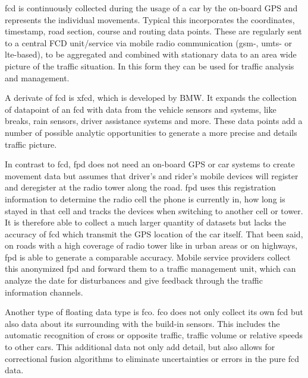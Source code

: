 \documentclass[a4paper,12pt]{report}
\begin{document}
\par \acrfull{fcd} is continuously collected during the usage of a car by the on-board GPS and represents the individual movements. Typical this incorporates the coordinates, timestamp, road section, course and routing data points. These are regularly sent to a central FCD unit/service via mobile radio communication (\acrshort{gsm}-, \acrshort{umts}- or \acrshort{lte}-based), to be aggregated and combined with stationary data to an area wide picture of the traffic situation. In this form they can be used for traffic analysis and management. \cite{Randelhoff2016,LAPID2020}

\par A derivate of \acrshort{fcd} is \acrfull{xfcd}, which is developed by BMW. It expands the collection of datapoint of an \acrshort{fcd} with data from the vehicle sensors and systems, like breaks, rain sensors, driver assistance systems and more. These data points add a number of possible analytic opportunities to generate a more precise and details traffic picture. \cite{LAPID2020}

\par In contrast to \acrshort{fcd}, \acrlong{fpd} does not need an on-board GPS or car systems to create movement data but assumes that driver’s and rider’s mobile devices will register and deregister at the radio tower along the road. \acrshort{fpd} uses this registration information to determine the radio cell the phone is currently in, how long is stayed in that cell and tracks the devices when switching to another cell or tower. It is therefore able to collect a much larger quantity of datasets but lacks the accuracy of \acrshort{fcd} which transmit the GPS location of the car itself. That been said, on roads with a high coverage of radio tower like in urban areas or on highways, \acrshort{fpd} is able to generate a comparable accuracy. Mobile service providers collect this anonymized \acrshort{fpd} and forward them to a traffic management unit, which can analyze the date for disturbances and give feedback through the traffic information channels. \cite{Randelhoff2016,LAPID2020}

\par Another type of floating data type is \acrfull{fco}. \acrshort{fco} does not only collect its own \acrshort{fcd} but also data about its surrounding with the build-in sensors. This includes the automatic recognition of cross or opposite traffic, traffic volume or relative speeds to other cars. This additional data not only add detail, but also allows for correctional fusion algorithms to eliminate uncertainties or errors in the pure \acrshort{fcd} data. \cite{Randelhoff2016}
\end{document}

